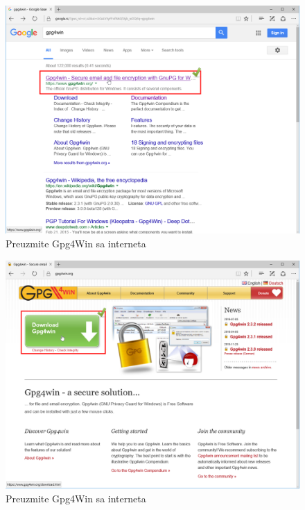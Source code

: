 \documentclass[a4paper,11pt]{article}
\begin{document}
\begin{figure}[!h]
	\begin{center}
		\includegraphics[width=\textwidth]{01_gpg4win_download.png}
		\caption{Preuzmite Gpg4Win sa interneta}
		\label{initialscreen}
	\end{center}
\end{figure}
\newpage
\begin{figure}[!h]
	\begin{center}
		\includegraphics[width=\textwidth]{02-Gpg4win_download.png}
		\caption{Preuzmite Gpg4Win sa interneta}
		\label{initialscreen}
	\end{center}
\end{figure}
\end{document}
